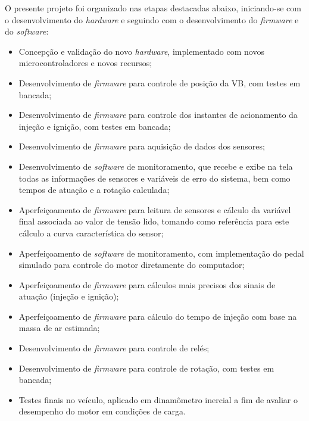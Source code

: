 	O presente projeto foi organizado nas etapas destacadas abaixo, iniciando-se com o desenvolvimento do \textit{hardware} e seguindo com o desenvolvimento do \textit{firmware} e do \textit{software}:
	
	\begin{itemize}
	\item Concepção e validação do novo \textit{hardware}, implementado com novos microcontroladores e novos recursos;
	\item Desenvolvimento de \textit{firmware} para controle de posição da VB, com testes em bancada;
	\item Desenvolvimento de \textit{firmware} para controle dos instantes de acionamento da injeção e ignição, com testes em bancada;
	\item Desenvolvimento de \textit{firmware} para aquisição de dados dos sensores;
	\item Desenvolvimento de \textit{software} de monitoramento, que recebe e exibe na tela todas as informações de sensores e variáveis de erro do sistema, bem como tempos de atuação e a rotação calculada;
	\item Aperfeiçoamento de \textit{firmware} para leitura de sensores e cálculo da variável final associada ao valor de tensão lido, tomando como referência para este cálculo a curva característica do sensor;
	\item Aperfeiçoamento de \textit{software} de monitoramento, com implementação do pedal simulado para controle do motor diretamente do computador;
	\item Aperfeiçoamento de \textit{firmware} para cálculos mais precisos dos sinais de atuação (injeção e ignição);
	\item Aperfeiçoamento de \textit{firmware} para cálculo do tempo de injeção com base na massa de ar estimada;
	\item Desenvolvimento de \textit{firmware} para controle de relés;
	\item Desenvolvimento de \textit{firmware} para controle de rotação, com testes em bancada;
	\item Testes finais no veículo, aplicado em dinamômetro inercial a fim de avaliar o desempenho do motor em condições de carga.
	\end{itemize}
